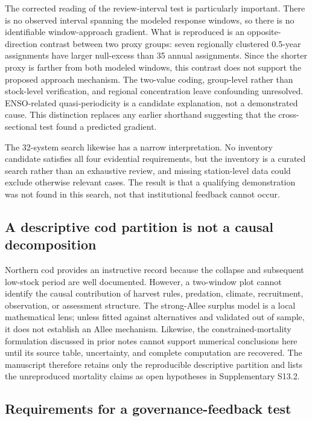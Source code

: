 The corrected reading of the review-interval test is particularly important. There is no observed interval spanning the modeled response windows, so there is no identifiable window-approach gradient. What is reproduced is an opposite-direction contrast between two proxy groups: seven regionally clustered 0.5-year assignments have larger null-excess than 35 annual assignments. Since the shorter proxy is farther from both modeled windows, this contrast does not support the proposed approach mechanism. The two-value coding, group-level rather than stock-level verification, and regional concentration leave confounding unresolved. ENSO-related quasi-periodicity is a candidate explanation, not a demonstrated cause. This distinction replaces any earlier shorthand suggesting that the cross-sectional test found a predicted gradient.

The 32-system search likewise has a narrow interpretation. No inventory candidate satisfies all four evidential requirements, but the inventory is a curated search rather than an exhaustive review, and missing station-level data could exclude otherwise relevant cases. The result is that a qualifying demonstration was not found in this search, not that institutional feedback cannot occur.

\subsection{A descriptive cod partition is not a causal decomposition}

Northern cod provides an instructive record because the collapse and subsequent low-stock period are well documented. However, a two-window plot cannot identify the causal contribution of harvest rules, predation, climate, recruitment, observation, or assessment structure. The strong-Allee surplus model is a local mathematical lens; unless fitted against alternatives and validated out of sample, it does not establish an Allee mechanism. Likewise, the constrained-mortality formulation discussed in prior notes cannot support numerical conclusions here until its source table, uncertainty, and complete computation are recovered. The manuscript therefore retains only the reproducible descriptive partition and lists the unreproduced mortality claims as open hypotheses in Supplementary S13.2.

\subsection{Requirements for a governance-feedback test}

